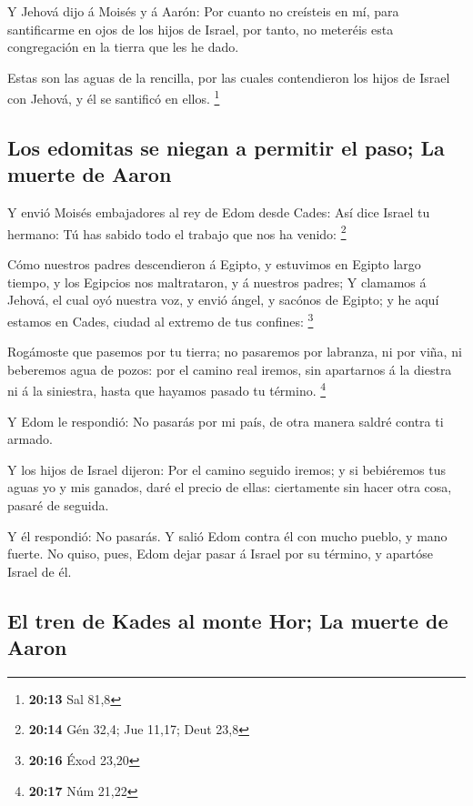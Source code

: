  Y Jehová dijo á Moisés y á Aarón: Por cuanto no
creísteis en mí, para santificarme en ojos de los hijos de Israel, por
tanto, no meteréis esta congregación en la tierra que les he dado.

 Estas son las aguas de la rencilla, por las cuales
contendieron los hijos de Israel con Jehová, y él se santificó en ellos.
\footnote{\textbf{20:13} Sal 81,8}

\hypertarget{los-edomitas-se-niegan-a-permitir-el-paso-la-muerte-de-aaron}{%
\subsection{Los edomitas se niegan a permitir el paso; La muerte de
Aaron}\label{los-edomitas-se-niegan-a-permitir-el-paso-la-muerte-de-aaron}}

 Y envió Moisés embajadores al rey de Edom desde Cades:
Así dice Israel tu hermano: Tú has sabido todo el trabajo que nos ha
venido: \footnote{\textbf{20:14} Gén 32,4; Jue 11,17; Deut 23,8}

 Cómo nuestros padres descendieron á Egipto, y estuvimos
en Egipto largo tiempo, y los Egipcios nos maltrataron, y á nuestros
padres;  Y clamamos á Jehová, el cual oyó nuestra voz, y
envió ángel, y sacónos de Egipto; y he aquí estamos en Cades, ciudad al
extremo de tus confines: \footnote{\textbf{20:16} Éxod 23,20}

 Rogámoste que pasemos por tu tierra; no pasaremos por
labranza, ni por viña, ni beberemos agua de pozos: por el camino real
iremos, sin apartarnos á la diestra ni á la siniestra, hasta que hayamos
pasado tu término. \footnote{\textbf{20:17} Núm 21,22}

 Y Edom le respondió: No pasarás por mi país, de otra
manera saldré contra ti armado.

 Y los hijos de Israel dijeron: Por el camino seguido
iremos; y si bebiéremos tus aguas yo y mis ganados, daré el precio de
ellas: ciertamente sin hacer otra cosa, pasaré de seguida.

 Y él respondió: No pasarás. Y salió Edom contra él con
mucho pueblo, y mano fuerte.  No quiso, pues, Edom dejar
pasar á Israel por su término, y apartóse Israel de él.

\hypertarget{el-tren-de-kades-al-monte-hor-la-muerte-de-aaron}{%
\subsection{El tren de Kades al monte Hor; La muerte de
Aaron}\label{el-tren-de-kades-al-monte-hor-la-muerte-de-aaron}}

